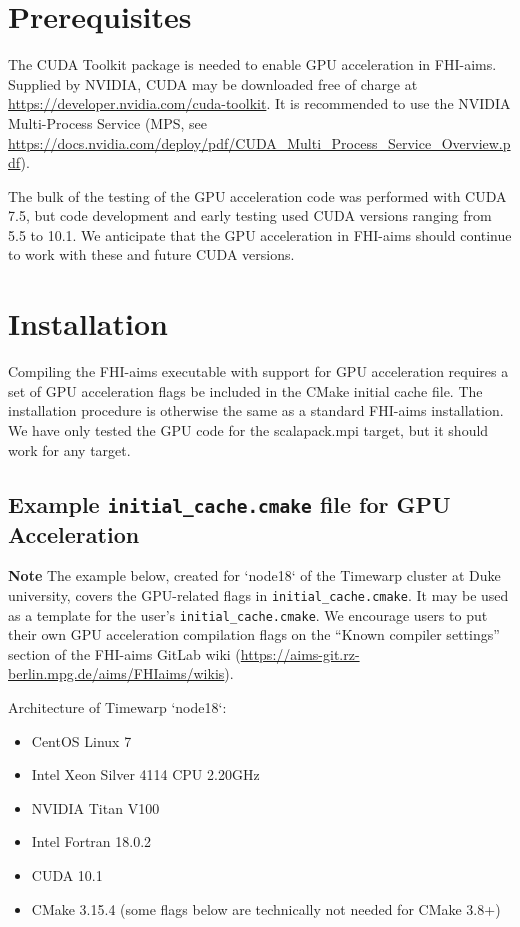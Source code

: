 \section{Prerequisites}
The CUDA Toolkit package is needed to enable GPU acceleration in FHI-aims. Supplied by NVIDIA, CUDA may be downloaded free of charge at \url{https://developer.nvidia.com/cuda-toolkit}. It is recommended to use the NVIDIA Multi-Process Service (MPS, see \url{https://docs.nvidia.com/deploy/pdf/CUDA_Multi_Process_Service_Overview.pdf}).

The bulk of the testing of the GPU acceleration code was performed with CUDA 7.5, but code development and early testing used CUDA versions ranging from 5.5 to 10.1. We anticipate that the GPU acceleration in FHI-aims should continue to work with these and future CUDA versions.

\section{Installation}
Compiling the FHI-aims executable with support for GPU acceleration requires a set of GPU acceleration flags be included in the CMake initial cache file. The installation procedure is otherwise the same as a standard FHI-aims installation. We have only tested the GPU code for the scalapack.mpi target, but it should work for any target.

\subsection{Example \texttt{initial\_cache.cmake} file for GPU Acceleration}

\textbf{Note} The example below, created for `node18` of the Timewarp cluster at Duke university, covers the GPU-related flags in \texttt{initial\_cache.cmake}. It may be used as a template for the user's \texttt{initial\_cache.cmake}. We encourage users to put their own GPU acceleration compilation flags on the ``Known compiler settings'' section of the FHI-aims GitLab wiki (\url{https://aims-git.rz-berlin.mpg.de/aims/FHIaims/wikis}).

Architecture of Timewarp `node18`:
\begin{itemize}
\item CentOS Linux 7
\item Intel Xeon Silver 4114 CPU 2.20GHz
\item NVIDIA Titan V100
\item Intel Fortran 18.0.2
\item CUDA 10.1
\item CMake 3.15.4 (some flags below are technically not needed for CMake 3.8+)
\end{itemize}

